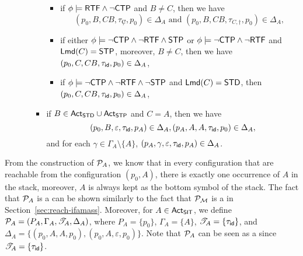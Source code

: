 \begin{itemize}
\begin{itemize}
\begin{itemize}
\begin{itemize}
\begin{itemize}
				\end{itemize}
%
				\item if $\phi \models {\sf RTF} \wedge \neg{\sf CTP}$ and $B\neq C$,  then
                we have 
                $$(p_0, B, CB, \tau_{\not C}, p_0) \in \Delta_{A} \mbox{ and } (p_0, B, CB, \tau_{C, \dag}, p_0) \in \Delta_{A},$$
%
				\item if either $\phi \models \neg{\sf CTP} \wedge \neg {\sf RTF} \wedge {\sf STP}$ or $\phi \models \neg{\sf CTP} \wedge \neg {\sf RTF}$ and ${\sf Lmd}(C) = {\sf STP}$, moreover, $B \neq C$, then we have $(p_0, C, CB, \tau_{\mathsf{id}}, p_0) \in \Delta_{A}$, 
				\item if $\phi \models \neg{\sf CTP} \wedge \neg {\sf RTF} \wedge \neg {\sf STP}$ and ${\sf Lmd}(C) = {\sf STD}$, then $(p_0, C, CB, \tau_{\mathsf{id}}, p_0) \in \Delta_{A}$,
				\end{itemize}
				
				\item if $B \in {\sf Act}_{\sf STD} \cup {\sf Act}_{\sf STP}$ and $C = A$,  then we have 
				$$(p_0, B, \varepsilon, \tau_{\mathsf{id}}, p_A) \in \Delta_{A}, (p_A, A, A, \tau_{\mathsf{id}}, p_0)  \in \Delta_{A},$$ 
				and for each $\gamma \in \Gamma_A \setminus \{A\}$, $(p_A, \gamma, \varepsilon, \tau_{\mathsf{id}}, p_A) \in \Delta_{A}$. 
            \end{itemize}
        \end{itemize}
\end{itemize}
From the construction of ${\mathcal{P} }_A$, we know that in every configuration that are reachable from the configuration $(p_0, A)$, there is exactly one occurrence of $A$ in the stack, moreover,  $A$ is always kept as the bottom symbol of the stack. 
The fact that ${\mathcal{P} }_{A}$ is a {\WOTrPDS} can be shown similarly to the fact that ${\mathcal{P} }_{\mathcal{M} }$ is a {\WOTrPDS} in Section~\ref{sec:reach-ifamass}.
Moreover, for $A \in {\sf Act}_{\sf SIT}$, we define ${\mathcal{P} }_A = (P_A, \Gamma_A, {\mathscr{T} }_A, \Delta_A)$, where $P_A = \{p_0\}$, $\Gamma_A = \{A\}$, ${\mathscr{T} }_A = \{\tau_{\mathsf{id}}\}$, and $\Delta_A = \{(p_0, A, A, p_0), (p_0, A, \varepsilon, p_0)\}$. Note that ${\mathcal{P} }_A$ can be seen as a {\PDS} since ${\mathscr{T} }_A = \{\tau_{\mathsf{id}}\}$.


